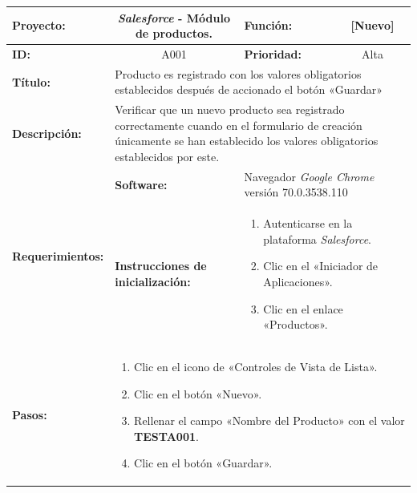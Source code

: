 \begin{table}
\renewcommand{\arraystretch}{1}
\linespread{1}
\centering
\begin{tabular}{|p{2.5cm}|p{2.8cm}|p{2.2cm}|p{2.8cm}|p{2.2cm}|}
\hline
\footnotesize{\textbf{Proyecto:}} &
\multicolumn{2}{c|}{\footnotesize{\emph{Salesforce} - Módulo de productos.}} &
\footnotesize{\textbf{Función:}} &
\multicolumn{1}{c|}{\footnotesize{[Nuevo]}} \\
\hline
\footnotesize{\textbf{ID:}} & \multicolumn{2}{c|}{\footnotesize{A001}} &
\footnotesize{\textbf{Prioridad:}} &
\multicolumn{1}{c|}{\footnotesize{Alta}} \\
\hline
\footnotesize{\textbf{Título:}} &
\multicolumn{4}{p{12.4cm}|}{\footnotesize{Producto es registrado con los valores
obligatorios establecidos después de accionado el botón «Guardar»}} \\
\hline
\footnotesize{\textbf{Descripción:}} &
\multicolumn{4}{p{12.4cm}|}{\footnotesize{Verificar que un nuevo producto sea
registrado correctamente cuando en el formulario de creación únicamente se han
establecido los valores obligatorios establecidos por este.}} \\
\hline
\multirow{2}{*}{\footnotesize{\textbf{Requerimientos:}}} &
\footnotesize{\textbf{Software:}} &
\multicolumn{3}{p{7.8cm}|}{\footnotesize{Navegador \emph{Google Chrome}
versión 70.0.3538.110}} \\
\cline{2-5}
& \footnotesize{\textbf{Instrucciones de inicialización:}} &
\multicolumn{3}{p{7.8cm}|}{\footnotesize{
\vspace{-3mm}
\begin{enumerate}
\item Autenticarse en la plataforma \emph{Salesforce}.
\item Clic en el «Iniciador de Aplicaciones».
\item Clic en el enlace «Productos».
\end{enumerate}
\vspace{-5mm}
}} \\
\hline
\footnotesize{\textbf{Pasos:}} &
\multicolumn{4}{p{11.8cm}|}{\footnotesize{
\vspace{-3mm}
\begin{enumerate}
\item Clic en el icono de «Controles de Vista de Lista».
\item Clic en el botón «Nuevo».
\item Rellenar el campo «Nombre del Producto» con el valor \textbf{TESTA001}.
\item Clic en el botón «Guardar».

\end{enumerate}}}
\end{tabular}
\end{table}
